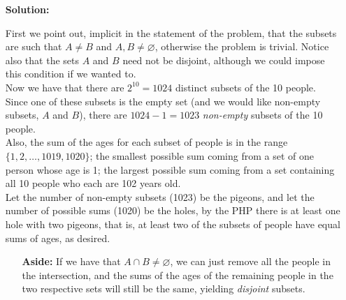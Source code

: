 \documentclass[twoside]{article}
\theoremstyle{mystyle}
\begin{document}
\begin{enumerate}
\item[{\bfseries Solution:}]

First we point out, implicit in the statement of the problem, that the subsets are such that $A \ne B$ and $A, B \ne \varnothing$, otherwise the problem is trivial. Notice also that the sets $A$ and $B$ need not be disjoint, although we could impose this condition if we wanted to.\\

Now we have that there are $2^{10} = 1024$ distinct subsets of the 10 people. Since one of these subsets is the empty set (and we would like non-empty subsets, $A$ and $B$), there are $1024 - 1  = 1023$ \emph{non-empty} subsets of the 10 people. \\

Also, the sum of the ages for each subset of people is in the range $\{1, 2, \ldots, 1019, 1020\}$; the smallest possible sum coming from a set of one person whose age is 1; the largest possible sum coming from a set containing all 10 people who each are 102 years old. \\

Let the number of non-empty subsets (1023) be the pigeons, and let the number of possible sums (1020) be the holes, by the PHP there is at least one hole with two pigeons, that is, at least two of the subsets of people have equal sums of ages, as desired.

\begin{enumerate}

\item[{\bfseries Aside:}] If we have that $A \cap B \ne \varnothing$, we can just remove all the people in the intersection, and the sums of the ages of the remaining people in the two respective sets will still be the same, yielding \emph{disjoint} subsets. 

\end{enumerate}
\end{enumerate}
\end{document}
